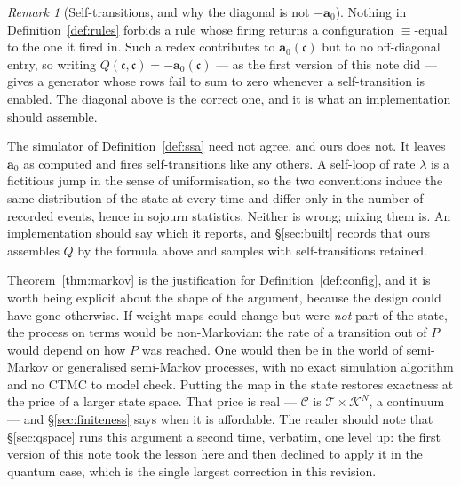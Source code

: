 \documentclass[11pt,a4paper]{article}
\theoremstyle{plain}
\theoremstyle{definition}
\theoremstyle{remark}
\newtheorem{remark}[theorem]{Remark}
\newcommand{\Terms}{\mathcal{T}}
\newcommand{\Cfg}{\mathcal{C}}
\newcommand{\prop}{\mathbf{a}}
\begin{document}
\begin{remark}[Self-transitions, and why the diagonal is not $-\prop_0$]
\label{rem:selfloop}
Nothing in Definition~\ref{def:rules} forbids a rule whose firing returns a configuration
$\equiv$-equal to the one it fired in. Such a redex contributes to $\prop_0(\mathfrak{c})$ but to no
off-diagonal entry, so writing $Q(\mathfrak{c},\mathfrak{c}) = -\prop_0(\mathfrak{c})$ --- as the
first version of this note did --- gives a generator whose rows fail to sum to zero whenever a
self-transition is enabled. The diagonal above is the correct one, and it is what an implementation
should assemble.

The simulator of Definition~\ref{def:ssa} need not agree, and ours does not. It leaves $\prop_0$ as
computed and fires self-transitions like any others. A self-loop of rate $\lambda$ is a fictitious
jump in the sense of uniformisation, so the two conventions induce the same distribution of the state
at every time and differ only in the number of recorded events, hence in sojourn statistics. Neither
is wrong; mixing them is. An implementation should say which it reports, and \S\ref{sec:built}
records that ours assembles $Q$ by the formula above and samples with self-transitions retained.
\end{remark}

Theorem~\ref{thm:markov} is the justification for Definition~\ref{def:config}, and it is worth being
explicit about the shape of the argument, because the design could have gone otherwise. If weight
maps could change but were \emph{not} part of the state, the process on terms would be
non-Markovian: the rate of a transition out of $P$ would depend on how $P$ was reached. One would
then be in the world of semi-Markov or generalised semi-Markov processes, with no exact simulation
algorithm and no CTMC to model check. Putting the map in the state restores exactness at the price
of a larger state space. That price is real --- $\Cfg$ is $\Terms \times \mathcal{K}^N$, a
continuum --- and \S\ref{sec:finiteness} says when it is affordable. The reader should note that
\S\ref{sec:qspace} runs this argument a second time, verbatim, one level up: the first version of
this note took the lesson here and then declined to apply it in the quantum case, which is the single
largest correction in this revision.
\end{document}
